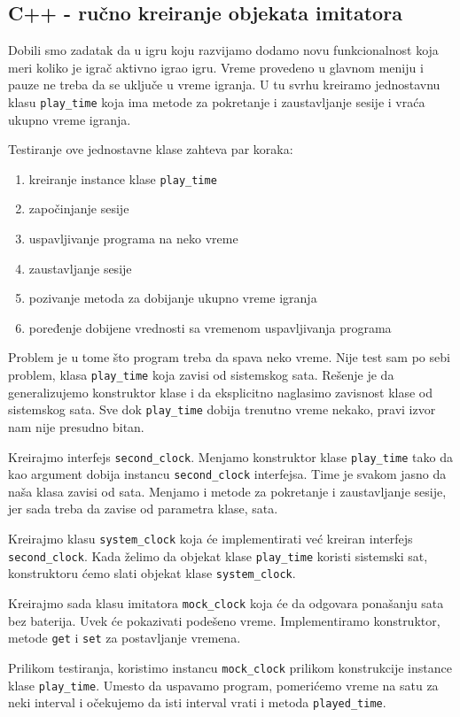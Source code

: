 \subsection{C++ - ručno kreiranje objekata imitatora}\label{c---ruux10dno-kreiranje-objekata-imitatora}

Dobili smo zadatak da u igru koju razvijamo dodamo novu funkcionalnost koja meri koliko je igrač aktivno igrao igru. Vreme provedeno u glavnom meniju i pauze ne treba da se uključe u vreme igranja. U tu svrhu kreiramo jednostavnu klasu \texttt{play\_time} koja ima metode za pokretanje i zaustavljanje sesije i vraća ukupno vreme igranja.

Testiranje ove jednostavne klase zahteva par koraka:

\begin{enumerate}
\def\labelenumi{\arabic{enumi}.}
\tightlist
\item
  kreiranje instance klase \texttt{play\_time}
\item
  započinjanje sesije
\item
  uspavljivanje programa na neko vreme
\item
  zaustavljanje sesije
\item
  pozivanje metoda za dobijanje ukupno vreme igranja
\item
  poređenje dobijene vrednosti sa vremenom uspavljivanja programa
\end{enumerate}

Problem je u tome što program treba da spava neko vreme. Nije test sam po sebi problem, klasa \texttt{play\_time} koja zavisi od sistemskog sata. Rešenje je da generalizujemo konstruktor klase i da eksplicitno naglasimo zavisnost klase od sistemskog sata. Sve dok \texttt{play\_time} dobija trenutno vreme nekako, pravi izvor nam nije presudno bitan.

Kreirajmo interfejs \texttt{second\_clock}. Menjamo konstruktor klase \texttt{play\_time} tako da kao argument dobija instancu \texttt{second\_clock} interfejsa. Time je svakom jasno da naša klasa zavisi od sata. Menjamo i metode za pokretanje i zaustavljanje sesije, jer sada treba da zavise od parametra klase, sata.

Kreirajmo klasu \texttt{system\_clock} koja će implementirati već kreiran interfejs \texttt{second\_clock}. Kada želimo da objekat klase \texttt{play\_time} koristi sistemski sat, konstruktoru ćemo slati objekat klase \texttt{system\_clock}.

Kreirajmo sada klasu imitatora \texttt{mock\_clock} koja će da odgovara ponašanju sata bez baterija. Uvek će pokazivati podešeno vreme. Implementiramo konstruktor, metode \texttt{get} i \texttt{set} za postavljanje vremena.

Prilikom testiranja, koristimo instancu \texttt{mock\_clock} prilikom konstrukcije instance klase \texttt{play\_time}. Umesto da uspavamo program, pomerićemo vreme na satu za neki interval i očekujemo da isti interval vrati i metoda \texttt{played\_time}.
